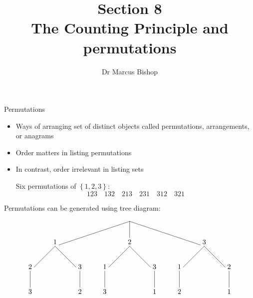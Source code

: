 \documentclass[handout]{beamer}
\title[\S8]{Section 8\\The Counting Principle and permutations}
\author{Dr Marcus Bishop}
\theoremstyle{definition}
\begin{document}
\begin{frame}\titlepage\end{frame}
\LogoOff

\begin{frame}{Permutations}
\begin{itemize}
\item Ways of arranging set of distinct objects called
\alert{permutations}, \alert{arrangements}, or \alert{anagrams}
\item Order matters in listing permutations
\item In contrast, order irrelevant in listing sets
\begin{example} Six permutations of $\left\{1,2,3\right\}$:
\[123\quad 132\quad 213\quad 231\quad 312\quad 321\]
\end{example}
\end{itemize}
\end{frame}

\begin{frame}
Permutations can be generated using tree diagram:
\[\begin{xy}<1.25cm,0cm>:
(0,0)="0";
(-3,-1)="-31";
(0,-1)="01";
(3,-1)="31";
"0";"-31"*+!D{1}**\dir{-};
"0";"01"*+!D{2}**\dir{-};
"0";"31"*+!D{3}**\dir{-};
"-31";(-4,-2)*+!D{2}**\dir{-};
(-4,-3)*+!D{3}**\dir{-};
"-31";(-2,-2)*+!D{3}**\dir{-};
(-2,-3)*+!D{2}**\dir{-};
"01";(-1,-2)*+!D{1}**\dir{-};
(-1,-3)*+!D{3}**\dir{-};
"01";(1,-2)*+!D{3}**\dir{-};
(1,-3)*+!D{1}**\dir{-};
"31";(2,-2)*+!D{1}**\dir{-};
(2,-3)*+!D{2}**\dir{-};
"31";(4,-2)*+!D{2}**\dir{-};
(4,-3)*+!D{1}**\dir{-};
\end{xy}\]
\end{frame}
\end{document}
